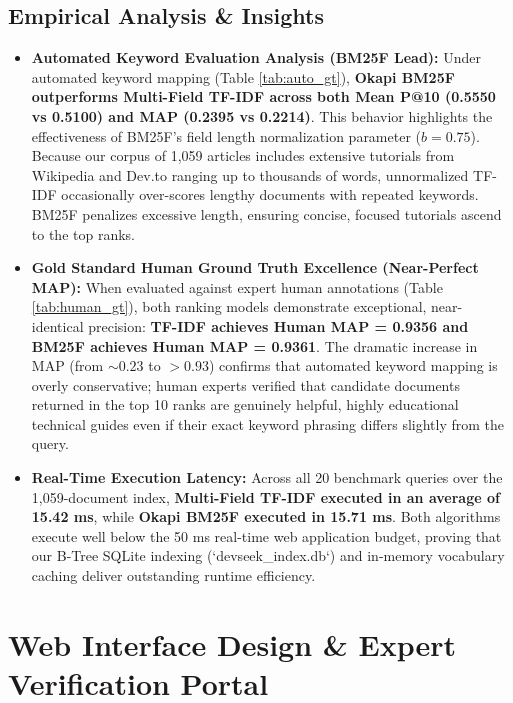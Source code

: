\documentclass[12pt,a4paper]{article}
\begin{document}
\subsection{Empirical Analysis \& Insights}
\begin{itemize}
    \item \textbf{Automated Keyword Evaluation Analysis (BM25F Lead):} Under automated keyword mapping (Table \ref{tab:auto_gt}), \textbf{Okapi BM25F outperforms Multi-Field TF-IDF across both Mean P@10 (0.5550 vs 0.5100) and MAP (0.2395 vs 0.2214)}. This behavior highlights the effectiveness of BM25F's field length normalization parameter ($b=0.75$). Because our corpus of 1,059 articles includes extensive tutorials from Wikipedia and Dev.to ranging up to thousands of words, unnormalized TF-IDF occasionally over-scores lengthy documents with repeated keywords. BM25F penalizes excessive length, ensuring concise, focused tutorials ascend to the top ranks.
    \item \textbf{Gold Standard Human Ground Truth Excellence (Near-Perfect MAP):} When evaluated against expert human annotations (Table \ref{tab:human_gt}), both ranking models demonstrate exceptional, near-identical precision: \textbf{TF-IDF achieves Human MAP = 0.9356 and BM25F achieves Human MAP = 0.9361}. The dramatic increase in MAP (from $\sim 0.23$ to $> 0.93$) confirms that automated keyword mapping is overly conservative; human experts verified that candidate documents returned in the top 10 ranks are genuinely helpful, highly educational technical guides even if their exact keyword phrasing differs slightly from the query.
    \item \textbf{Real-Time Execution Latency:} Across all 20 benchmark queries over the 1,059-document index, \textbf{Multi-Field TF-IDF executed in an average of 15.42 ms}, while \textbf{Okapi BM25F executed in 15.71 ms}. Both algorithms execute well below the 50 ms real-time web application budget, proving that our B-Tree SQLite indexing (`devseek\_index.db`) and in-memory vocabulary caching deliver outstanding runtime efficiency.
\end{itemize}

\section{Web Interface Design \& Expert Verification Portal}
\end{document}
